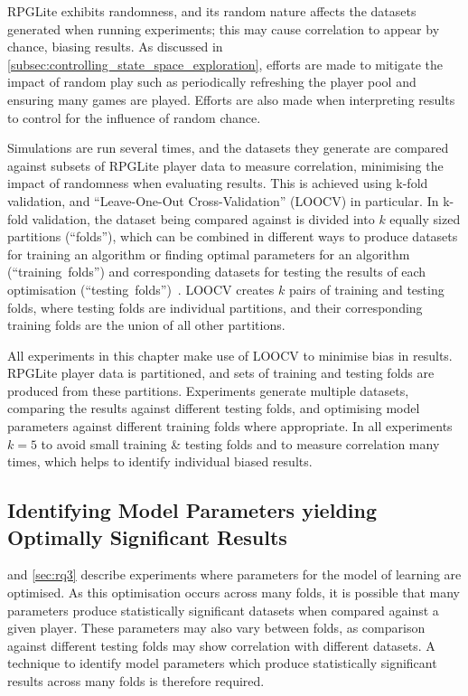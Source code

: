 RPGLite exhibits randomness, and its random nature affects the datasets
generated when running experiments; this may cause correlation to appear by
chance, biasing results. As discussed in
\cref{subsec:controlling_state_space_exploration}, efforts are made to mitigate
the impact of random play such as periodically refreshing the player pool and
ensuring many games are played. Efforts are also made when interpreting results
to control for the influence of random chance.

Simulations are run several times, and the datasets they generate are compared
against subsets of RPGLite player data to measure correlation, minimising the
impact of randomness when evaluating results. This is achieved using k-fold
validation, and ``Leave-One-Out Cross-Validation'' (LOOCV) in particular. In
k-fold validation, the dataset being compared against is divided into $k$
equally sized partitions (``folds''), which can be combined in different ways to
produce datasets for training an algorithm or finding optimal parameters for an
algorithm (``training~folds'') and corresponding datasets for testing the
results of each optimisation
(``testing~folds'')~\cite{k-fold-validation-definition}. LOOCV creates $k$ pairs
of training and testing folds, where testing folds are individual partitions,
and their corresponding training folds are the union of all other partitions.

All experiments in this chapter make use of LOOCV to minimise bias in results.
RPGLite player data is partitioned, and sets of training and testing folds are
produced from these partitions. Experiments generate multiple datasets,
comparing the results against different testing folds, and optimising model
parameters against different training folds where appropriate. In all
experiments \(k = 5\) to avoid small training \& testing folds and to measure
correlation many times, which helps to identify individual biased results.


\subsection{Identifying Model Parameters yielding Optimally Significant Results}
\label{identifying-significant-results-explanation}

 and \cref{sec:rq3} describe experiments where parameters for the
model of learning are optimised. As this optimisation occurs across many folds,
it is possible that many parameters produce statistically significant datasets
when compared against a given player. These parameters may also vary between
folds, as comparison against different testing folds may show correlation with
different datasets. A technique to identify model parameters which produce
statistically significant results across many folds is therefore required.

